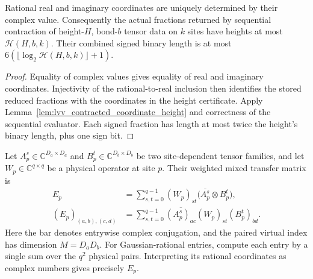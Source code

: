 \begin{lemma}
    \label{lem:lvv_computed_rational_coordinate_height}
    \leanok
    Rational real and imaginary coordinates are uniquely determined by
    their complex value. Consequently the actual fractions returned by
    sequential contraction of height-$H$, bond-$b$ tensor data on $k$
    sites have heights at most $\mathcal H(H,b,k)$. Their combined signed
    binary length is at most
    $6(\lfloor\log_2\mathcal H(H,b,k)\rfloor+1)$.
\end{lemma}
\begin{proof}\leanok
    Equality of complex values gives equality of real and imaginary
    coordinates. Injectivity of the rational-to-real inclusion then
    identifies the stored reduced fractions with the coordinates in the
    height certificate. Apply Lemma~\ref{lem:lvv_contracted_coordinate_height}
    and correctness of the sequential evaluator. Each signed fraction
    has length at most twice the height's binary length, plus one sign bit.
\end{proof}

\begin{definition}
    \label{def:lvv_weighted_mixed_transfer}
    \leanok
    Let $A_p^s\in\mathbb C^{D_a\times D_a}$ and
    $B_p^t\in\mathbb C^{D_b\times D_b}$ be two site-dependent tensor
    families, and let $W_p\in\mathbb C^{q\times q}$ be a physical
    operator at site $p$. Their weighted mixed transfer matrix is
    \begin{align*}
        E_p                 & =\sum_{s,t=0}^{q-1}(W_p)_{st}
        \bigl(\overline{A_p^s}\otimes B_p^t\bigr),          \\
        (E_p)_{(a,b),(c,d)} & =\sum_{s,t=0}^{q-1}
        \overline{(A_p^s)_{ac}}(W_p)_{st}(B_p^t)_{bd}.
    \end{align*}
    Here the bar denotes entrywise complex conjugation, and the paired
    virtual index has dimension $M=D_aD_b$.
    For Gaussian-rational entries, compute each entry by a single sum
    over the $q^2$ physical pairs. Interpreting its rational coordinates
    as complex numbers gives precisely $E_p$.
\end{definition}

